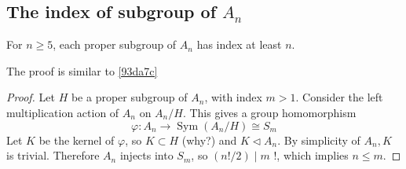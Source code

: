 \subsection{The index of subgroup of \texorpdfstring{$A_n$}{A_n}}

\begin{corollary}
For $n \geq 5$, each proper subgroup of $A_n$ has index at least $n$.
\end{corollary}
\begin{note}
The proof is similar to \cref{93da7c}
\end{note}
\begin{proof}
Let $H$ be a proper subgroup of $A_n$, with index $m>1$. Consider the left multiplication action of $A_n$ on $A_n / H$. This gives a group homomorphism
\[
\varphi: A_n \rightarrow \operatorname{Sym}\left(A_n / H\right) \cong S_m
\]
Let $K$ be the kernel of $\varphi$, so $K \subset H$ (why?) and $K \triangleleft A_n$. By simplicity of $A_n, K$ is trivial. Therefore $A_n$ injects into $S_m$, so $(n!/ 2) \mid m$ !, which implies $n \leq m$.
\end{proof}
